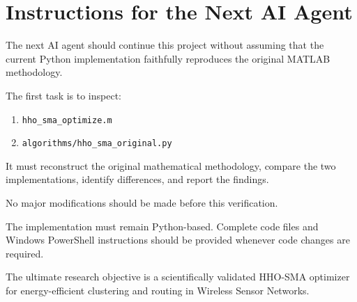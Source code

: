 \documentclass[12pt,a4paper]{report}
\begin{document}
\chapter{Instructions for the Next AI Agent}

The next AI agent should continue this project
without assuming that the current Python implementation
faithfully reproduces the original MATLAB methodology.

The first task is to inspect:

\begin{enumerate}
    \item \texttt{hho\_sma\_optimize.m}
    \item \texttt{algorithms/hho\_sma\_original.py}
\end{enumerate}

It must reconstruct the original mathematical
methodology, compare the two implementations,
identify differences, and report the findings.

No major modifications should be made before
this verification.

The implementation must remain Python-based.
Complete code files and Windows PowerShell
instructions should be provided whenever code
changes are required.

The ultimate research objective is a scientifically
validated HHO-SMA optimizer for energy-efficient
clustering and routing in Wireless Sensor Networks.

\end{document}
